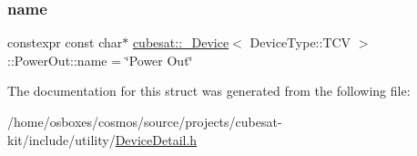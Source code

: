 \subsubsection{\texorpdfstring{name}{name}}
{\footnotesize\ttfamily constexpr const char$\ast$ \hyperlink{structcubesat_1_1__Device}{cubesat\+::\+\_\+\+Device}$<$ Device\+Type\+::\+T\+CV $>$\+::Power\+Out\+::name = \char`\"{}Power Out\char`\"{}\hspace{0.3cm}{\ttfamily [static]}}



The documentation for this struct was generated from the following file\+:\begin{DoxyCompactItemize}
\item 
/home/osboxes/cosmos/source/projects/cubesat-\/kit/include/utility/\hyperlink{DeviceDetail_8h}{Device\+Detail.\+h}\end{DoxyCompactItemize}
